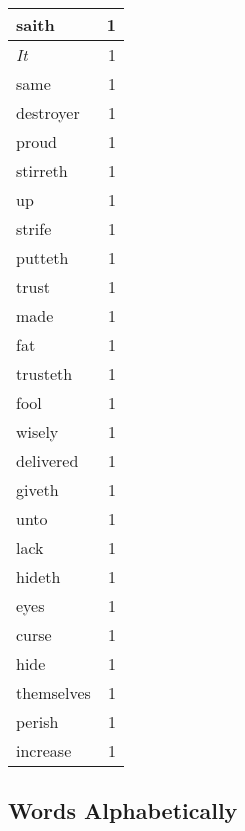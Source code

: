 \begin{center}
\begin{longtable}{l|r}
saith & 1\\ \hline 
\emph{It} & 1\\ \hline 
same & 1\\ \hline 
destroyer & 1\\ \hline 
proud & 1\\ \hline 
stirreth & 1\\ \hline 
up & 1\\ \hline 
strife & 1\\ \hline 
putteth & 1\\ \hline 
trust & 1\\ \hline 
made & 1\\ \hline 
fat & 1\\ \hline 
trusteth & 1\\ \hline 
fool & 1\\ \hline 
wisely & 1\\ \hline 
delivered & 1\\ \hline 
giveth & 1\\ \hline 
unto & 1\\ \hline 
lack & 1\\ \hline 
hideth & 1\\ \hline 
eyes & 1\\ \hline 
curse & 1\\ \hline 
hide & 1\\ \hline 
themselves & 1\\ \hline 
perish & 1\\ \hline 
increase & 1\\ \hline 
\end{longtable}  
\end{center}  


  
\normalsize  

  
  


\subsection{Words Alphabetically}

